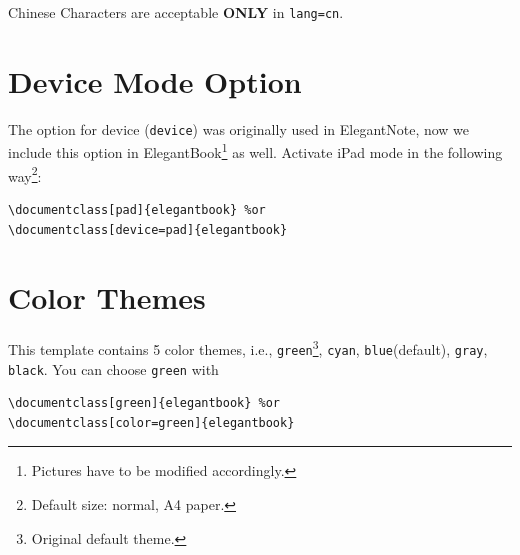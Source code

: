 \documentclass[11pt,bibtex]{elegantbook}
\begin{document}
\begin{remark}
Chinese Characters  are acceptable \textbf{ONLY} in \lstinline{lang=cn}.
\end{remark}

\section{Device Mode Option}
The option for device (\lstinline{device}) was originally used in ElegantNote, now we include this option in ElegantBook\footnote{Pictures have to be modified accordingly.} as well. Activate iPad mode in the following way\footnote{Default size: normal, A4 paper.}:
\begin{lstlisting}
\documentclass[pad]{elegantbook} %or
\documentclass[device=pad]{elegantbook}
\end{lstlisting}

\section{Color Themes}
This template contains 5 color themes, i.e., \textcolor{structure1}{\lstinline{green}}\footnote{Original default theme.}, \textcolor{structure2}{\lstinline{cyan}}, \textcolor{structure3}{\lstinline{blue}}(default), \textcolor{structure4}{\lstinline{gray}}, \textcolor{structure5}{\lstinline{black}}. You can choose \lstinline{green} with
\begin{lstlisting}
\documentclass[green]{elegantbook} %or
\documentclass[color=green]{elegantbook}
\end{lstlisting}
\end{document}
